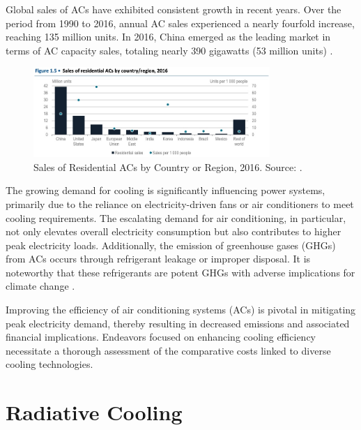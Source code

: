 Global sales of ACs have exhibited consistent growth in recent years. Over the period from 1990 to 2016, annual AC sales experienced a nearly fourfold increase, reaching 135 million units. In 2016, China emerged as the leading market in terms of AC capacity sales, totaling nearly 390 gigawatts (53 million units) \cite{international_energy_agency_future_2018}.

\begin{figure}
  \centering
  \includegraphics[width=0.8\textwidth]{Chapters/Figures/Chapter 1 Figures/Sales of Residential ACs by Country or Region, 2016.jpg}
  \caption[Sales of Residential ACs by Country or Region, 2016]{Sales of Residential ACs by Country or Region, 2016. Source: \cite{international_energy_agency_future_2018}.}
  \label{fig:sales_acs}
\end{figure}

The growing demand for cooling is significantly influencing power systems, primarily due to the reliance on electricity-driven fans or air conditioners to meet cooling requirements. The escalating demand for air conditioning, in particular, not only elevates overall electricity consumption but also contributes to higher peak electricity loads. Additionally, the emission of greenhouse gases (GHGs) from ACs occurs through refrigerant leakage or improper disposal. It is noteworthy that these refrigerants are potent GHGs with adverse implications for climate change \cite{international_energy_agency_future_2018}.

Improving the efficiency of air conditioning systems (ACs) is pivotal in mitigating peak electricity demand, thereby resulting in decreased emissions and associated financial implications. Endeavors focused on enhancing cooling efficiency necessitate a thorough assessment of the comparative costs linked to diverse cooling technologies.


\section{Radiative Cooling}

